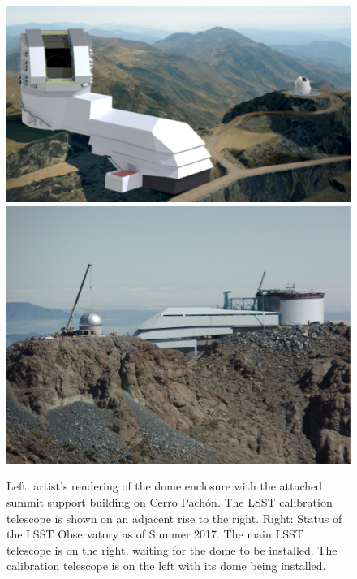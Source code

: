 \begin{figure}
\includegraphics[width=1.0\hsize,clip]{observatoryFull.pdf}
\includegraphics[width=1.0\hsize,clip]{ObservatoryFull_2017.pdf}
\caption{Left: artist's rendering of the dome enclosure 
with the attached summit support building on Cerro Pach\'{o}n. The LSST calibration 
telescope is shown on an adjacent rise to the right.
Right: Status of the LSST Observatory as of Summer 2017. The main LSST telescope is on the right, waiting for the dome to be installed. The calibration telescope is on the left with its dome being installed.} 
\label{Fig:observatory}
\end{figure}

